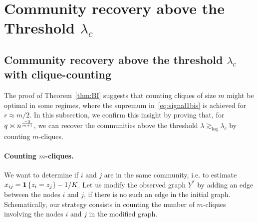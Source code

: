 \documentclass[final]{colt2026}
\newcommand{\1}{\mathbf{1}}
\newcommand{\pa}[1]{\left(#1\right)}
\newcommand{\ac}[1]{\left\{#1\right\}}
\begin{document}
%
%
%
%


\section{Community recovery above the Threshold $\lambda_{c}$}\label{sec:positive}


\subsection{Community recovery above the threshold $\lambda_{c}$ with clique-counting}\label{sec:cliques-counting}
The proof of Theorem~\ref{thm:BI} suggests that counting cliques of size $m$ might be optimal in some regimes, where the supremum in~\eqref{eq:signal1bis} is achieved for $r\approx m/2$. 
In this subsection, we confirm this insight by proving that, for $q\asymp n^{-2\over m+1}$, we can recover the communities above the threshold $\lambda \gtrsim_{\log} \lambda_{c}$ by counting $m$-cliques. 

\paragraph{Counting $m$-cliques.}
We want to determine if $i$ and $j$ are in the same community, i.e. to estimate $x_{ij}={\bf 1}\ac{z_{i}=z_{j}}-1/K$.
 Let us modify the observed graph $Y^*$ by adding an edge between the nodes $i$ and $j$, if there is no such an edge in the initial graph. Schematically, our strategy consists in counting the number of $m$-cliques involving the nodes $i$ and $j$ in the modified graph. 
\end{document}
